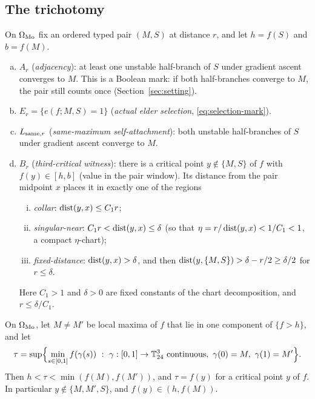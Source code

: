 \subsection{The trichotomy}\label{ssec:selection-trichotomy}

\begin{definition}\label{def:selection-events}
On $\Omega_{\rm Mo}$ fix an ordered typed pair $(M,S)$ at distance $r$, and let $h=f(S)$ and $b=f(M)$.
\begin{enumerate}[(a)]
\item $A_r$ (\emph{adjacency}): at least one unstable half-branch of $S$ under gradient ascent converges to $M$. This is a Boolean mark: if both half-branches converge to $M$, the pair still counts once (Section~\ref{sec:setting}).
\item $E_r=\{e(f;M,S)=1\}$ (\emph{actual elder selection}, \eqref{eq:selection-mark}).
\item $L_{{\rm same},r}$ (\emph{same-maximum self-attachment}): both unstable half-branches of $S$ under gradient ascent converge to $M$.
\item $B_r$ (\emph{third-critical witness}): there is a critical point $y\notin\{M,S\}$ of $f$ with $f(y)\in[h,b]$ (value in the pair window). Its distance from the pair midpoint $x$ places it in exactly one of the regions
\begin{enumerate}[(i)]
\item \emph{collar}: $\operatorname{dist}(y,x)\le C_1r$;
\item \emph{singular-near}: $C_1r<\operatorname{dist}(y,x)\le\delta$ (so that $\eta=r/\operatorname{dist}(y,x)<1/C_1<1$, a compact $\eta$-chart);
\item \emph{fixed-distance}: $\operatorname{dist}(y,x)>\delta$, and then $\operatorname{dist}(y,\{M,S\})>\delta-r/2\ge\delta/2$ for $r\le\delta$.
\end{enumerate}
Here $C_1>1$ and $\delta>0$ are fixed constants of the chart decomposition, and $r\le\delta/C_1$.
\end{enumerate}
\end{definition}

\begin{lemma}\label{lem:selection-merge}
On $\Omega_{\rm Mo}$, let $M\ne M'$ be local maxima of $f$ that lie in one component of $\{f>h\}$, and let
\[
\tau=\sup\Bigl\{\min_{s\in[0,1]}f(\gamma(s))\ :\ \gamma:[0,1]\to\T^3_{24}\ \text{continuous},\ \gamma(0)=M,\ \gamma(1)=M'\Bigr\}.
\]
Then $h<\tau<\min(f(M),f(M'))$, and $\tau=f(y)$ for a critical point $y$ of $f$. In particular $y\notin\{M,M',S\}$, and $f(y)\in(h,f(M))$.
\end{lemma}

